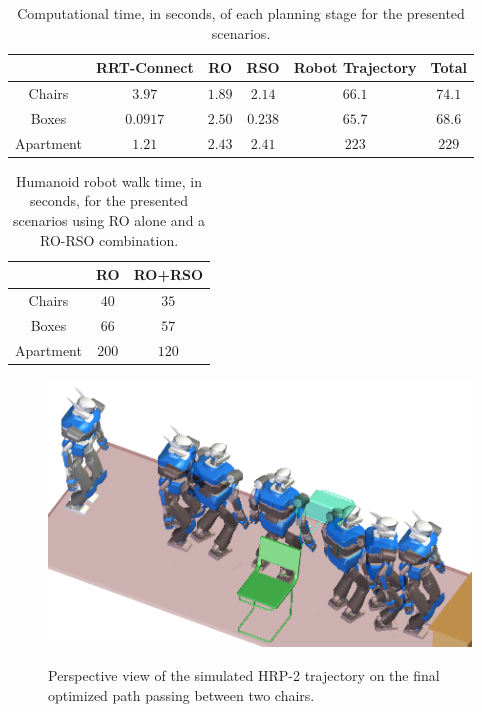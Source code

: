 \begin{table}
\centering
\begin{tabular}{c|c|c|c|c|c|}
  \cline{2-6}
  & RRT-Connect & RO & RSO & Robot Trajectory & Total\\
  \hline
  \multicolumn{1}{|c|}{Chairs} & $3.97$ & $1.89$ & $2.14$ & $66.1$ & $74.1$\\
  \hline
  \multicolumn{1}{|c|}{Boxes} & $0.0917$ & $2.50$ & $0.238$ & $65.7$ & $68.6$\\
  \hline
  \multicolumn{1}{|c|}{Apartment} & $1.21$ & $2.43$ & $2.41$ & $223$ & $229$ \\
  \hline
\end{tabular}
\caption{Computational time, in seconds, of each planning stage for
  the presented scenarios.}
\label{tab:chap1-computation-time}
\end{table}

\begin{table}
\centering
\begin{tabular}{c|c|c|}
  \cline{2-3}
  & RO & RO+RSO \\
  \hline
  \multicolumn{1}{|c|}{Chairs} & $40$ & $35$ \\
  \hline
  \multicolumn{1}{|c|}{Boxes} & $66$ & $57$ \\
  \hline
  \multicolumn{1}{|c|}{Apartment} & $200$ & $120$ \\
  \hline
\end{tabular}
\caption{Humanoid robot walk time, in seconds, for the presented
  scenarios using RO alone and a RO-RSO combination.}
\label{tab:chap1-walk-time}
\end{table}

\begin{figure}
  \centering
      {\includegraphics[width = 0.8\linewidth]
        {src/chap1-path-optimization/chairs-hash-optim-perspective-hrp2.png}}
      \caption{Perspective view of the simulated HRP-2 trajectory on
        the final optimized path passing between two chairs.}
      \label{fig:chap1-chairs-hash-optim-perspective-hrp2}
\end{figure}

